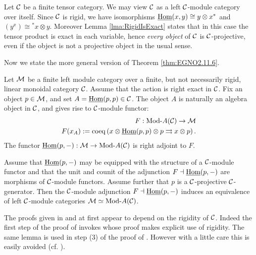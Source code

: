 \documentclass{amsart}
\begin{document}
\begin{example} \label{ex:rigid_all_C-proj}
	Let $\mathcal C$ be a finite tensor category. We may view $\mathcal C$ as a left $\mathcal C$-module category over itself. Since $\mathcal C$ is rigid, we have isomorphisms $\operatorname{\underline{Hom}}(x,y) \cong y \otimes x^*$ and $(y^x) \cong {}^*x \otimes y$. Moreover Lemma \ref{lma:RigidIsExact} states that in this case the tensor product is exact in each variable, hence {\em every object} of $\mathcal C$ is $\mathcal C$-projective, even if the object is not a projective object in the usual sense. %
\end{example}

Now we state the more general version of Theorem \ref{thm:EGNO2.11.6}.

\begin{theorem} \label{thm:C-module-Embedding} %
	Let $\mathcal M$ be a finite left module category over a finite, but not necessarily rigid, linear monoidal category $\mathcal C$. Assume that the action is right exact in $\mathcal C$. 
	Fix an object $p \in \mathcal M$, and set $A = \operatorname{\underline{Hom}}(p,p) \in \mathcal C$. The object $A$ is naturally an algebra object in $\mathcal C$, and gives rise to $\mathcal C$-module functor:
	\begin{align*}
		F:   \Mod{}{A}(\cC) \to \cM \\
		F(x_A) := \coeq \left( x \otimes \IHom(p,p) \otimes p \rightrightarrows x \otimes p \right).
	\end{align*}
The functor $\IHom(p,-): \cM \to \Mod{}{A}(\cC)$ is right adjoint to $F$. 

Assume that $\operatorname{\underline{Hom}}(p,-)$ may be equipped with the structure of a $\mathcal C$-module functor and that the unit and counit of the adjunction $F \dashv \operatorname{\underline{Hom}}(p,-)$ are morphisms of $\mathcal C$-module functors. Assume further that $p$ is a $\mathcal C$-projective $\mathcal C$-generator.  Then the $\mathcal C$-module adjunction  $F \dashv \operatorname{\underline{Hom}}(p,-)$
	induces an equivalence of left $\mathcal C$-module categories $\cM \simeq \Mod{}{A}(\cC)$. 
\end{theorem}

\noindent The proofs given in \cite{EGNO} and \cite{MR1976459} at first appear to depend on  the rigidity of $\mathcal C$. Indeed the first step of the proof of \cite[Thm 2.11.2]{EGNO} invokes \cite[lemma 2.10.4.(4)]{EGNO} whose proof makes explicit use of rigidity. The same lemma is used in step (3) of the proof of \cite[Thm 1]{MR1976459}. However with a little care this is easily avoided (cf. \cite[Rmk. 2.11.3]{EGNO}). 
\end{document}
